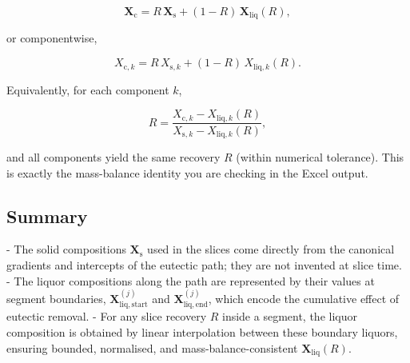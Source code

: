 \[
\mathbf{X}_{\mathrm{c}}
= R \, \mathbf{X}_{\mathrm{s}}
  + (1 - R) \, \mathbf{X}_{\mathrm{liq}}(R),
\]


or componentwise,


\[
X_{\mathrm{c},k}
= R \, X_{\mathrm{s},k}
  + (1 - R) \, X_{\mathrm{liq},k}(R).
\]



Equivalently, for each component \(k\),


\[
R
= \frac{X_{\mathrm{c},k} - X_{\mathrm{liq},k}(R)}
       {X_{\mathrm{s},k} - X_{\mathrm{liq},k}(R)},
\]


and all components yield the same recovery \(R\) (within numerical
tolerance). This is exactly the mass-balance identity you are checking
in the Excel output.

\subsection*{Summary}

- The solid compositions \(\mathbf{X}_{\mathrm{s}}\) used in the slices
  come directly from the canonical gradients and intercepts of the
  eutectic path; they are not invented at slice time.
- The liquor compositions along the path are represented by their
  values at segment boundaries, \(\mathbf{X}^{(j)}_{\mathrm{liq,start}}\)
  and \(\mathbf{X}^{(j)}_{\mathrm{liq,end}}\), which encode the cumulative
  effect of eutectic removal.
- For any slice recovery \(R\) inside a segment, the liquor composition
  is obtained by linear interpolation between these boundary liquors,
  ensuring bounded, normalised, and mass-balance-consistent
  \(\mathbf{X}_{\mathrm{liq}}(R)\).
